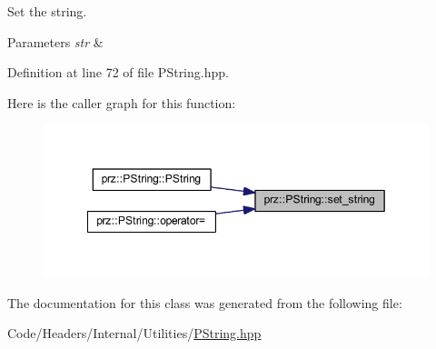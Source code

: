 Set the string. 


\begin{DoxyParams}{Parameters}
{\em str} & \\
\hline
\end{DoxyParams}


Definition at line 72 of file P\+String.\+hpp.

Here is the caller graph for this function\+:
\nopagebreak
\begin{figure}[H]
\begin{center}
\leavevmode
\includegraphics[width=349pt]{classprz_1_1_p_string_afcef04054a81bea83bca47ea3eb2a625_icgraph}
\end{center}
\end{figure}


The documentation for this class was generated from the following file\+:\begin{DoxyCompactItemize}
\item 
Code/\+Headers/\+Internal/\+Utilities/\mbox{\hyperlink{_p_string_8hpp}{P\+String.\+hpp}}\end{DoxyCompactItemize}
